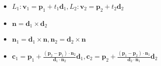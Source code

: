 \begin{itemize}
  \item $L_1: \boldsymbol{v}_1 = \boldsymbol{p}_1 + t_1\boldsymbol{d}_1, L_2: \boldsymbol{v}_2 = \boldsymbol{p}_2 + t_2\boldsymbol{d}_2$
  \item $\boldsymbol{n} = \boldsymbol{d}_1\times \boldsymbol{d}_2$
  \item $\boldsymbol{n}_1 = \boldsymbol{d}_1 \times \boldsymbol{n}, \boldsymbol{n}_2 = \boldsymbol{d}_2 \times \boldsymbol{n}$
  \item
    $\boldsymbol{c}_1 = \boldsymbol{p}_1 + \frac{(\boldsymbol{p}_2 - \boldsymbol{p}_1)\cdot\boldsymbol{n}_2}{\boldsymbol{d}_1\cdot\boldsymbol{n}_2}\boldsymbol{d}_1,
    \boldsymbol{c}_2 = \boldsymbol{p}_2 + \frac{(\boldsymbol{p}_1 - \boldsymbol{p}_2)\cdot\boldsymbol{n}_1}{\boldsymbol{d}_2\cdot\boldsymbol{n}_1}\boldsymbol{d}_2$
\end{itemize}
